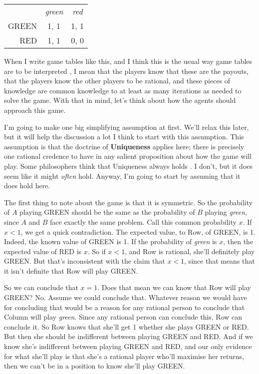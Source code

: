 \begin{center}
\begin{tabular}{r c c}
 & \textit{green} & \textit{red} \\
GREEN & 1, 1 & 1, 1 \\
RED & 1, 1 & 0, 0
\end{tabular}
\end{center}
When I write game tables like this, and I think this is the usual way game tables are to be interpreted \citep{Weatherson2012-WEAKBI}, I mean that the players know that these are the payouts, that the players know the other players to be rational, and these pieces of knowledge are common knowledge to at least as many iterations as needed to solve the game. With that in mind, let's think about how the agents should approach this game.

I'm going to make one big simplifying assumption at first. We'll relax this later, but it will help the discussion a lot I think to start with this assumption. This assumption is that the doctrine of \textbf{Uniqueness} applies here; there is precisely one rational credence to have in any salient proposition about how the game will play. Some philosophers think that Uniqueness always holds \citep{White2005-WHIEP}. I don't, but it does seem like it might \textit{often} hold. Anyway, I'm going to start by assuming that it does hold here.

The first thing to note about the game is that it is symmetric. So the probability of $A$ playing GREEN should be the same as the probability of $B$ playing \textit{green}, since $A$ and $B$ face exactly the same problem. Call this common probability $x$. If $x < 1$, we get a quick contradiction. The expected value, to Row, of GREEN, is 1. Indeed, the known value of GREEN is 1. If the probability of \textit{green} is $x$, then the expected value of RED is $x$. So if $x < 1$, and Row is rational, she'll definitely play GREEN. But that's inconsistent with the claim that $x < 1$, since that means that it isn't definite that Row will play GREEN.

So we can conclude that $x = 1$. Does that mean we can know that Row will play GREEN? No. Assume we could conclude that. Whatever reason we would have for concluding that would be a reason for any rational person to conclude that Column will play \textit{green}. Since any rational person can conclude this, Row can conclude it. So Row knows that she'll get 1 whether she plays GREEN or RED. But then she should be indifferent between playing GREEN and RED. And if we know she's indifferent between playing GREEN and RED, and our only evidence for what she'll play is that she's a rational player who'll maximise her returns, then we can't be in a position to know she'll play GREEN.

